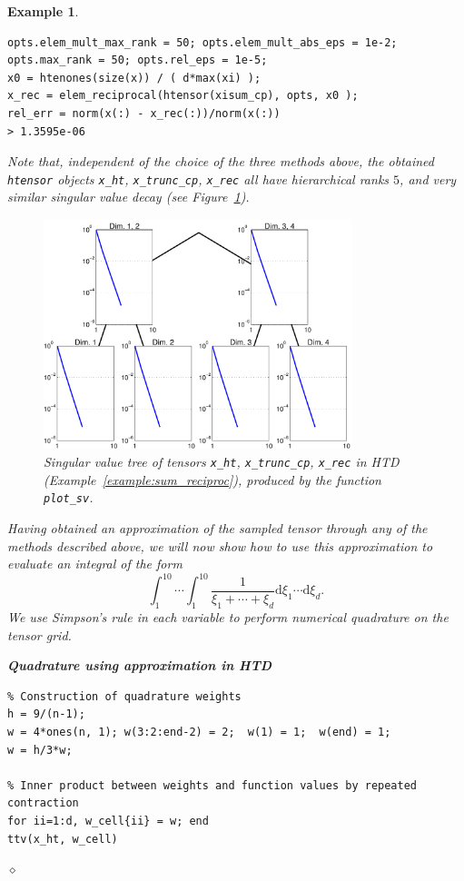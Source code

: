 \documentclass[11pt, a4paper]{article}
\newtheorem{example}[theorem]{\bf Example}
\begin{document}
\begin{example}
\begin{framed}
\begin{verbatim}
opts.elem_mult_max_rank = 50; opts.elem_mult_abs_eps = 1e-2;
opts.max_rank = 50; opts.rel_eps = 1e-5;
x0 = htenones(size(x)) / ( d*max(xi) );
x_rec = elem_reciprocal(htensor(xisum_cp), opts, x0 );
rel_err = norm(x(:) - x_rec(:))/norm(x(:))
> 1.3595e-06
\end{verbatim}\vspace{-1ex}
\end{framed}
Note that, independent of the choice of the three methods above, the obtained
\texttt{htensor} objects \texttt{x\_ht}, \texttt{x\_trunc\_cp}, \texttt{x\_rec} all have hierarchical ranks $5$, and very similar singular value decay (see Figure~\ref{fig:example_sv}).
\begin{figure}
\begin{center}
  \includegraphics[width=9cm]{example_sv}
\end{center}
\caption{Singular value tree of tensors \texttt{x\_ht}, \texttt{x\_trunc\_cp}, \texttt{x\_rec} in HTD (Example~\ref{example:sum_reciproc}), produced by the function \texttt{plot\_sv}.} 
\label{fig:example_sv}
\end{figure}
Having obtained an approximation of the sampled tensor through any of
the methods described above, we will now show how to use this approximation to evaluate an integral of the form
\[
\int_1^{10} \cdots \int_1^{10} \frac{1}{\xi_1 + \cdots + \xi_d} \text{d}\xi_1 \cdots \text{d}\xi_d.
\]
We use Simpson's rule in each variable to perform numerical quadrature on the tensor grid.
\begin{framed}\small \noindent
\textbf{Quadrature using approximation in HTD}\\
\vspace{-3ex} 
\begin{verbatim}
% Construction of quadrature weights 
h = 9/(n-1);
w = 4*ones(n, 1); w(3:2:end-2) = 2;  w(1) = 1;  w(end) = 1;
w = h/3*w;

% Inner product between weights and function values by repeated contraction
for ii=1:d, w_cell{ii} = w; end
ttv(x_ht, w_cell)
\end{verbatim} 
\vspace{-2ex}
\end{framed}
\hfill $\diamond$
\end{example}
\end{document}
